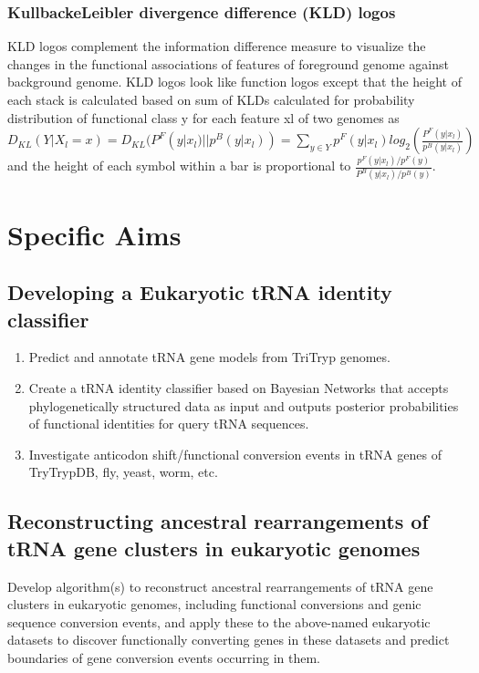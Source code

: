 \documentclass[
10pt, %
a4paper, %
oneside, %
headinclude,footinclude, %
BCOR5mm, %
]{scrartcl}
\begin{document}
\subsubsection*{\textbf{KullbackeLeibler divergence difference (KLD) logos}}
KLD logos \cite{FREYHULT20071276} complement the information difference measure to visualize the changes in the functional associations of features of foreground genome against background genome. KLD logos look like function logos except that the height of each stack is calculated based on sum of KLDs calculated for probability distribution of functional class y for each feature xl of two genomes as $D_{KL}(Y|X_l=x)=D_{KL}(P^F(y|x_l)||p^B(y|x_l))= \sum_{y \in Y} p^F(y|x_l)log_2(\frac{P^F(y|x_l)}{p^B(y|x_l)})$ and the height of each symbol within a bar is proportional to $\frac{p^F(y|x_l)/p^F(y)}{P^B(y|x_l)/p^B(y)}$.


\section{Specific Aims}
\subsection{\textbf{Developing a Eukaryotic tRNA identity classifier}}
 
\begin{enumerate}[noitemsep] %
\item Predict and annotate tRNA gene models from TriTryp genomes. %
\item Create a tRNA identity classifier based on Bayesian Networks that accepts phylogenetically structured data as input and outputs posterior probabilities of functional identities for query tRNA sequences.
\item Investigate anticodon shift/functional conversion events in tRNA genes of TryTrypDB, fly, yeast, worm, etc. 

\end{enumerate} 
\subsection{\textbf{Reconstructing ancestral rearrangements of tRNA gene clusters in eukaryotic genomes}}
Develop algorithm(s) to reconstruct ancestral rearrangements of tRNA gene clusters in eukaryotic genomes, including functional conversions and genic sequence conversion events, and apply these to the above-named eukaryotic datasets to discover functionally converting genes in these datasets and predict boundaries of gene conversion events occurring in them.  
\end{document}
